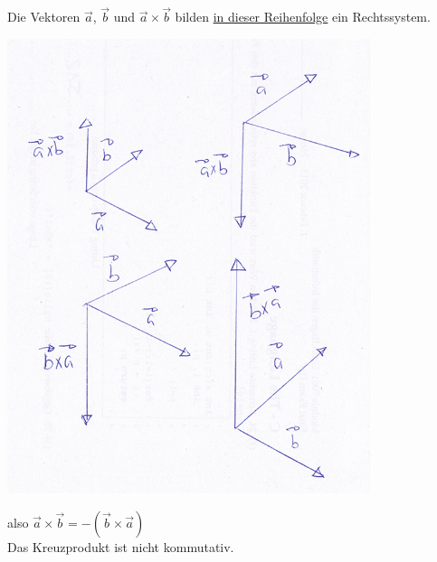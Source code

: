  Die Vektoren $\vec{a}$, $\vec{b}$ und $\vec{a} \times \vec{b}$ bilden \underline{in dieser Reihenfolge} ein Rechtssystem.\\
\begin{center}
	 \includegraphics[width=0.8\textwidth]{imgs/rechtssystem_reihenfolge.png}
 \end{center}
 also $\vec{a} \times \vec{b} = -(\vec{b} \times \vec{a})$\\
 Das Kreuzprodukt ist nicht kommutativ.
 \newpage
